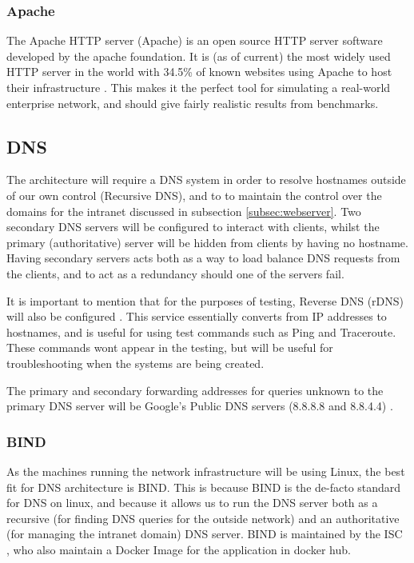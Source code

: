 \subsubsection{Apache}
\label{apacheserver}
The Apache HTTP server (Apache) is an open source HTTP server software developed by the apache foundation. It is (as of current) the most widely used HTTP server in the world with 34.5\% of known websites using Apache to host their infrastructure \citep{ApacheUsage}. This makes it the perfect tool for simulating a real-world enterprise network, and should give fairly realistic results from benchmarks.


\subsection{DNS}
The architecture will require a DNS system in order to resolve hostnames outside of our own control (Recursive DNS), and to to maintain the control over the domains for the intranet discussed in subsection \ref{subsec:webserver}. Two secondary DNS servers will be configured to interact with clients, whilst the primary (authoritative) server will be hidden from clients by having no hostname. Having secondary servers acts both as a way to load balance DNS requests from the clients, and to act as a redundancy should one of the servers fail.

It is important to mention that for the purposes of testing, Reverse DNS (rDNS) will also be configured \citep{rfc1035}. This service essentially converts from IP addresses to hostnames, and is useful for using test commands such as Ping and Traceroute. These commands wont appear in the testing, but will be useful for troubleshooting when the systems are being created.

The primary and secondary forwarding addresses for queries unknown to the primary DNS server will be Google's Public DNS servers (8.8.8.8 and 8.8.4.4) \citep{GooglePDNS}.

\subsubsection{BIND}
As the machines running the network infrastructure will be using Linux, the best fit for DNS architecture is BIND. This is because BIND is the de-facto standard for DNS on linux, and because it allows us to run the DNS server both as a recursive (for finding DNS queries for the outside network) and an authoritative (for managing the intranet domain) DNS server. BIND is maintained by the ISC \citep{ISCtimeline}, who also maintain a Docker Image for the application in docker hub.

